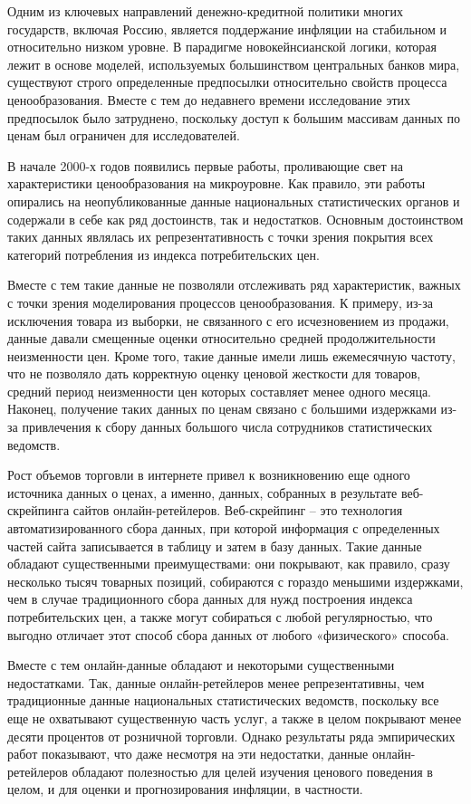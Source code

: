 
{\actuality} 

Одним из ключевых направлений денежно-кредитной политики многих государств, включая Россию, является поддержание инфляции на стабильном и относительно низком уровне. В парадигме новокейнсианской логики, которая лежит в основе моделей, используемых большинством центральных банков мира, существуют строго определенные предпосылки относительно свойств процесса ценообразования. Вместе с тем до недавнего времени исследование этих предпосылок было затруднено, поскольку доступ к большим массивам данных по ценам был ограничен для исследователей.

В начале 2000-х годов появились первые работы, проливающие свет на характеристики ценообразования на микроуровне. Как правило, эти работы опирались на неопубликованные данные национальных статистических органов и содержали в себе как ряд достоинств, так и недостатков. Основным достоинством таких данных являлась их репрезентативность с точки зрения покрытия всех категорий потребления из индекса потребительских цен. 

Вместе с тем такие данные не позволяли отслеживать ряд характеристик, важных с точки зрения моделирования процессов ценообразования. К примеру, из-за исключения товара из выборки, не связанного с его исчезновением из продажи, данные давали смещенные оценки относительно средней продолжительности неизменности цен. Кроме того, такие данные имели лишь ежемесячную частоту, что не позволяло дать корректную оценку ценовой жесткости для товаров, средний период неизменности цен которых составляет менее одного месяца. Наконец, получение таких данных по ценам связано с большими издержками из-за привлечения к сбору данных большого числа сотрудников статистических ведомств.

Рост объемов торговли в интернете привел к возникновению еще одного источника данных о ценах, а именно, данных, собранных в результате веб-скрейпинга сайтов онлайн-ретейлеров. Веб-скрейпинг – это технология автоматизированного сбора данных, при которой информация с определенных частей сайта записывается в таблицу и затем в базу данных. Такие данные обладают существенными преимуществами: они покрывают, как правило, сразу несколько тысяч товарных позиций, собираются с гораздо меньшими издержками, чем в случае традиционного сбора данных для нужд построения индекса потребительских цен, а также могут собираться с любой регулярностью, что выгодно отличает этот способ сбора данных от любого «физического» способа. 

Вместе с тем онлайн-данные обладают и некоторыми существенными недостатками. Так, данные онлайн-ретейлеров менее репрезентативны, чем традиционные данные национальных статистических ведомств, поскольку все еще не охватывают существенную часть услуг, а также в целом покрывают менее десяти процентов от розничной торговли. Однако результаты ряда эмпирических работ показывают, что даже несмотря на эти недостатки, данные онлайн-ретейлеров обладают полезностью для целей изучения ценового поведения в целом, и для оценки и прогнозирования инфляции, в частности.

